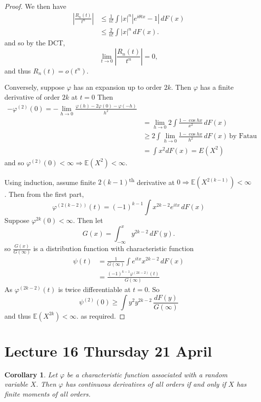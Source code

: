 \documentclass[10pt, oneside, reqno]{amsart}
\theoremstyle{plain}%
\newtheorem{cor}[thm]{Corollary}
\theoremstyle{definition}
\theoremstyle{remark}
\renewcommand{\phi}{\varphi}
\newcommand{\E}{\mathbb{E}}
\begin{document}
\begin{proof}
	We then have 
	\begin{align*}
		\left| \frac{R_n(t)}{t^n} \right| &\leq \frac{1}{n!} \int |x|^n | e^{i\theta tx} - 1 | \, dF(x) \\
		&\leq \frac{2}{n!} \int |x|^n \, dF(x).
	\end{align*} and so by the DCT, \[
		\lim_{t \rightarrow 0} \left| \frac{R_n(t)}{t^n} \right| = 0, 
	\] and thus $R_n(t) = o(t^n)$.
	
	Conversely, suppose $\phi$ has an expansion up to order $2k$.  Then $\phi$ has a finite derivative of order $2k$ at $t = 0$  Then \begin{align*}
		-\phi^{(2)}(0) = -\lim_{h \rightarrow 0} \frac{ \phi(h) - 2 \phi(0) - \phi(-h)}{h^2} \\
		&= \lim_{h \rightarrow 0} 2 \int \frac{1 - \cos hx}{x^2} \, dF(x) \\
		&\geq 2 \int \lim_{h \rightarrow 0} \frac{1 - \cos hx}{h^2} \, dF(x) \, \text{by Fatau} \\
		&= \int x^2 dF(x) = E(X^2)
	\end{align*} and so $\phi^{(2)}(0) < \infty \Rightarrow \E(X^2) < \infty$.    
	
	Using induction, assume finite $2(k-1)$\textsuperscript{th} derivative at $0 \Rightarrow \E(X^{2(k-1)}) < \infty$.  Then from the first part, \[
		\phi^{(2(k-2))}(t) = (-1)^{k-1} \int x^{2k-2} e^{itx} \, dF(x) 
	\]  Suppose $\phi^{2k}(0) < \infty$.  Then let \[
		G(x) = \int_{-\infty}^x y^{2k-2} \, dF(y).  
	\] so $\frac{G(x)}{G(\infty)}$ is a distribution function with characteristic function \begin{align*}
	\psi(t) &= \frac{1}{G(\infty)} \int e^{itx} x^{2k-2} \, dF(x) \\
			&= \frac{(-1)^{k-1} \phi^{(2k-2)}(t)}{G(\infty)}
	\end{align*}
	As $\phi^{(2k-2)}(t)$ is twice differentiable at $t = 0$.  So \[
		\psi^{(2)}(0) \geq \int y^2 y^{2k-2} \, \frac{dF(y)}{G(\infty)} 
	\] and thus $\E(X^{2k}) < \infty$.  as required.
\end{proof}

\section{Lecture 16 Thursday 21 April} %
\label{sec:lecture_16_thursday_21_april}
	\begin{cor}
		Let $\phi$ be a characteristic function associated with a random variable $X$.  Then $\phi$ has continuous derivatives of all orders if and only if $X$ has finite moments of all orders.  
	\end{cor}
	
\end{document}
